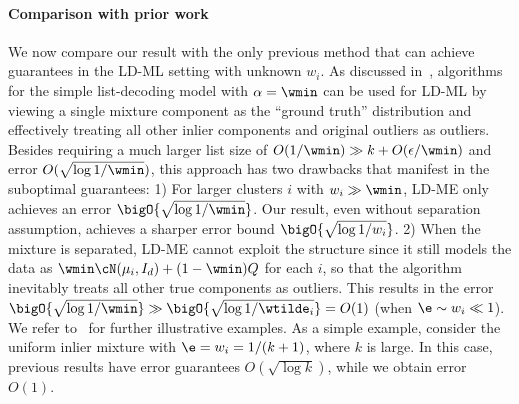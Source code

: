 \paragraph{Comparison with prior work} We now compare our result with the only previous method that can achieve guarantees in the LD-ML setting with unknown $w_i$. %
As discussed in~\cite{diakonikolas2018list}, algorithms for the simple list-decoding model with $\alpha = \wmin$ 
can be used for LD-ML by viewing a single mixture component as the ``ground truth''  distribution and effectively treating all other inlier components and original outliers as outliers.
Besides requiring a much larger list size of \(O(1 / \wmin) \gg k+O(\epsilon/\wmin) \) and error \(O(\sqrt{\log 1 / \wmin})\), this approach has two drawbacks that manifest in the suboptimal guarantees: 1) 
For larger clusters $i$ with $w_i \gg \wmin$, LD-ME only achieves an error $\bigO{\sqrt{\log 1 / \wmin}}$. Our result, even without separation assumption, achieves a sharper error bound \(\bigO{\sqrt{\log 1 / w_i}}\).
2) When the mixture is separated, LD-ME cannot exploit the structure since it still models the data as \(\wmin \cN(\mu_i, I_d) + (1 - \wmin) Q\) for each $i$, so that the algorithm inevitably treats all other true components as outliers.
This results in the error 
$\bigO{\sqrt{\log 1 / \wmin}} \gg \bigO{\sqrt{\log 1/\wtilde_i}} = O(1)$ (when \(\e \sim w_i \ll 1\)).
We refer to~ for further illustrative examples.
As a simple example, consider the uniform inlier mixture with \(\e = w_i = 1/(k + 1)\), where \(k\) is large. In this case, previous results have error guarantees \(O(\sqrt{\log k})\), while we obtain error \(O(1)\).
